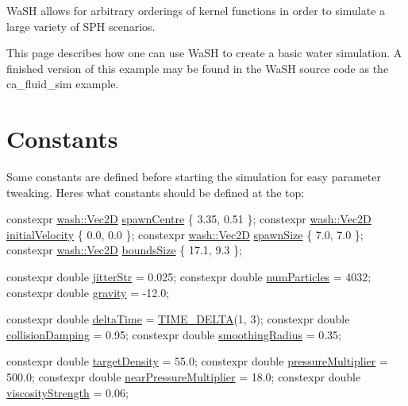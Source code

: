 Wa\+SH allows for arbitrary orderings of kernel functions in order to simulate a large variety of S\+PH scenarios.

This page describes how one can use Wa\+SH to create a basic water simulation. A finished version of this example may be found in the Wa\+SH source code as the {\ttfamily ca\+\_\+fluid\+\_\+sim} example.

\section*{Constants}

Some constants are defined before starting the simulation for easy parameter tweaking. Here\textquotesingle{}s what constants should be defined at the top\+: 
\begin{DoxyCode}
constexpr \mbox{\hyperlink{classwash_1_1Vec}{wash::Vec2D}} \mbox{\hyperlink{ca__fluid__sim_2fluid__sim_8cpp_a57d93ce8b44133ed956acc10a45e6223}{spawnCentre}} \{ 3.35, 0.51 \};
constexpr \mbox{\hyperlink{classwash_1_1Vec}{wash::Vec2D}} \mbox{\hyperlink{ca__fluid__sim_2fluid__sim_8cpp_ab15a76f258cadefcad1f4b39a8e76618}{initialVelocity}} \{ 0.0, 0.0 \};
constexpr \mbox{\hyperlink{classwash_1_1Vec}{wash::Vec2D}} \mbox{\hyperlink{ca__fluid__sim_2fluid__sim_8cpp_ab17b2a069e81c771262e861e014202d0}{spawnSize}} \{ 7.0, 7.0 \};
constexpr \mbox{\hyperlink{classwash_1_1Vec}{wash::Vec2D}} \mbox{\hyperlink{3d__fluid__sim_2fluid__sim_8cpp_ae3c8d23dc2c71306f6366b252c3ffb18}{boundsSize}} \{ 17.1, 9.3 \};

constexpr \textcolor{keywordtype}{double} \mbox{\hyperlink{ca__fluid__sim_2fluid__sim_8cpp_a39140666db6cb0c2fa813506654e739b}{jitterStr}} = 0.025;
constexpr \textcolor{keywordtype}{double} \mbox{\hyperlink{3d__fluid__sim_2fluid__sim_8cpp_adfee095e4b276ab10960391284f14410}{numParticles}} = 4032;
constexpr \textcolor{keywordtype}{double} \mbox{\hyperlink{3d__fluid__sim_2fluid__sim_8cpp_af81f980bddb2471a968025ae3a738fa9}{gravity}} = -12.0;

constexpr \textcolor{keywordtype}{double} \mbox{\hyperlink{3d__fluid__sim_2fluid__sim_8cpp_a78e0adba8d27825f587ec87ed578015f}{deltaTime}} = \mbox{\hyperlink{ca__fluid__sim_2fluid__sim_8cpp_a7ae2a6045aeb799eb72e4ee4d6015ac1}{TIME\_DELTA}}(1, 3);
constexpr \textcolor{keywordtype}{double} \mbox{\hyperlink{3d__fluid__sim_2fluid__sim_8cpp_ab103ceb8127270461e6653cc3a770182}{collisionDamping}} = 0.95;
constexpr \textcolor{keywordtype}{double} \mbox{\hyperlink{3d__fluid__sim_2fluid__sim_8cpp_aeb9760a781fb6ccf134ed4353c9888e5}{smoothingRadius}} = 0.35;

constexpr \textcolor{keywordtype}{double} \mbox{\hyperlink{3d__fluid__sim_2fluid__sim_8cpp_a8df34bc56a46bc3a73024f988bac3271}{targetDensity}} = 55.0;
constexpr \textcolor{keywordtype}{double} \mbox{\hyperlink{3d__fluid__sim_2fluid__sim_8cpp_a4a61cd5f68fcbc416bd3904622ab80fc}{pressureMultiplier}} = 500.0;
constexpr \textcolor{keywordtype}{double} \mbox{\hyperlink{3d__fluid__sim_2fluid__sim_8cpp_a7e14d37dda2b744892950a0a7a3c913a}{nearPressureMultiplier}} = 18.0;
constexpr \textcolor{keywordtype}{double} \mbox{\hyperlink{3d__fluid__sim_2fluid__sim_8cpp_a0f2e430964cc73edbaf77b1e4eeb2136}{viscosityStrength}} = 0.06;
\end{DoxyCode}



